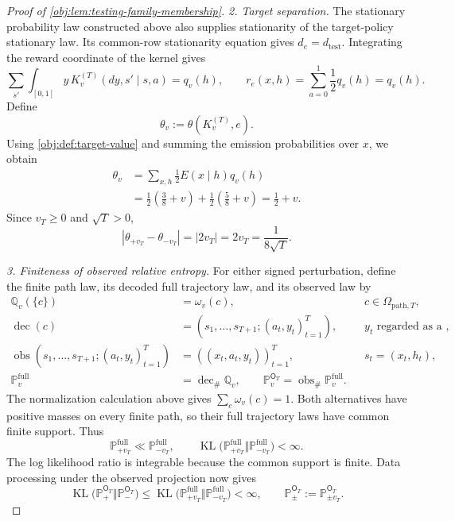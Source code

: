 \begin{proof}[Proof of \cref{obj:lem:testing-family-membership}]
\emph{2. Target separation.}
The stationary probability law constructed above also supplies stationarity of the target-policy stationary law. Its common-row stationarity equation gives \(d_e=d_{\mathrm{test}}\). Integrating the reward coordinate of the kernel gives
\[
\sum_{s'}\int_{[0,1]}y\,K_v^{(T)}(dy,s'\mid s,a)
=q_v(h),
\qquad
r_e(x,h)=\sum_{a=0}^1\frac12q_v(h)=q_v(h).
\]
Define
\[
\theta_v:=\theta(K_v^{(T)},e).
\]
Using \cref{obj:def:target-value} and summing the emission probabilities over \(x\), we obtain
\[
\begin{aligned}
\theta_v
&=\sum_{x,h}\frac12E(x\mid h)q_v(h)\\
&=\frac12\left(\frac38+v\right)
 +\frac12\left(\frac58+v\right)
=\frac12+v.
\end{aligned}
\]
Since \(v_T\geq0\) and \(\sqrt T>0\),
\[
|\theta_{+v_T}-\theta_{-v_T}|
=|2v_T|
=2v_T
=\frac1{8\sqrt T}.
\]

\emph{3. Finiteness of observed relative entropy.}
For either signed perturbation, define the finite path law, its decoded full trajectory law, and its observed law by
\[
\begin{aligned}
\mathbb Q_v(\{c\})&=\omega_v(c),
&&c\in\Omega_{\mathrm{path},T},\\
\operatorname{dec}(c)
&=(s_1,\ldots,s_{T+1};(a_t,y_t)_{t=1}^T),
&&y_t\text{ regarded as a real reward},\\
\operatorname{obs}
  (s_1,\ldots,s_{T+1};(a_t,y_t)_{t=1}^T)
&=((x_t,a_t,y_t))_{t=1}^T,
&&s_t=(x_t,h_t),\\
\mathbb P_v^{\mathrm{full}}
&=\operatorname{dec}_{\#}\mathbb Q_v,
\qquad
\mathbb P_v^{\mathsf O_T}
=\operatorname{obs}_{\#}\mathbb P_v^{\mathrm{full}}.
\end{aligned}
\]
The normalization calculation above gives
\(\sum_c\omega_v(c)=1\). Both alternatives have positive masses on every finite path, so their full trajectory laws have common finite support. Thus
\[
\mathbb P_{+v_T}^{\mathrm{full}}
\ll\mathbb P_{-v_T}^{\mathrm{full}},
\qquad
\operatorname{KL}
 \bigl(\mathbb P_{+v_T}^{\mathrm{full}}
       \Vert\mathbb P_{-v_T}^{\mathrm{full}}\bigr)<\infty.
\]
The log likelihood ratio is integrable because the common support is finite. Data processing under the observed projection now gives
\[
\operatorname{KL}
 \bigl(\mathbb P_{+}^{\mathsf O_T}
       \Vert\mathbb P_{-}^{\mathsf O_T}\bigr)
\leq
\operatorname{KL}
 \bigl(\mathbb P_{+v_T}^{\mathrm{full}}
       \Vert\mathbb P_{-v_T}^{\mathrm{full}}\bigr)
<\infty,
\qquad
\mathbb P_\pm^{\mathsf O_T}
:=\mathbb P_{\pm v_T}^{\mathsf O_T}.
\]


\end{proof}
